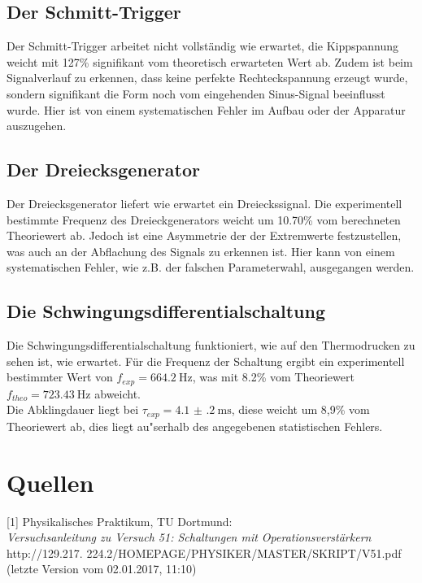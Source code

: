 \documentclass[]{scrartcl}
\let\oldsection\section
\renewcommand\section{\clearpage\oldsection}
\begin{document}
\subsection{Der Schmitt-Trigger}
Der Schmitt-Trigger arbeitet nicht vollständig wie erwartet, die Kippspannung weicht mit 127\% signifikant vom theoretisch erwarteten Wert ab. Zudem ist beim Signalverlauf zu erkennen, dass keine perfekte Rechteckspannung erzeugt wurde, sondern signifikant die Form noch vom eingehenden Sinus-Signal beeinflusst wurde. Hier ist von einem systematischen Fehler im Aufbau oder der Apparatur auszugehen.

\subsection{Der Dreiecksgenerator}
Der Dreiecksgenerator liefert wie erwartet ein Dreieckssignal. Die experimentell \\bestimmte Frequenz des Dreieckgenerators weicht um 10.70\% vom berechneten Theoriewert ab. Jedoch ist eine Asymmetrie der der Extremwerte festzustellen, was auch an der Abflachung des Signals zu erkennen ist. Hier kann von einem systematischen Fehler, wie z.B. der falschen Parameterwahl, ausgegangen werden.

\subsection{Die Schwingungsdifferentialschaltung}
Die Schwingungsdifferentialschaltung funktioniert, wie auf den Thermodrucken zu sehen ist, wie erwartet. Für die Frequenz der Schaltung ergibt ein experimentell bestimmter Wert von $f_{exp}=\SI{664.2}{\hertz}$, was mit 8.2\% vom Theoriewert $f_{theo}=\SI{723.43}{\hertz}$ abweicht. \\
Die Abklingdauer liegt bei $\tau_{exp}=\SI{4.1(2)}{\milli\second}$, diese weicht um 8,9\% vom Theoriewert ab, dies liegt au"serhalb des angegebenen statistischen Fehlers.

\section{Quellen}
{[1]} Physikalisches Praktikum, TU Dortmund: \\
\textit{Versuchsanleitung zu Versuch 51: Schaltungen mit Operationsverstärkern}\\
http://129.217.
224.2/HOMEPAGE/PHYSIKER/MASTER/SKRIPT/V51.pdf (letzte Version vom 02.01.2017, 11:10)\\
\end{document}
